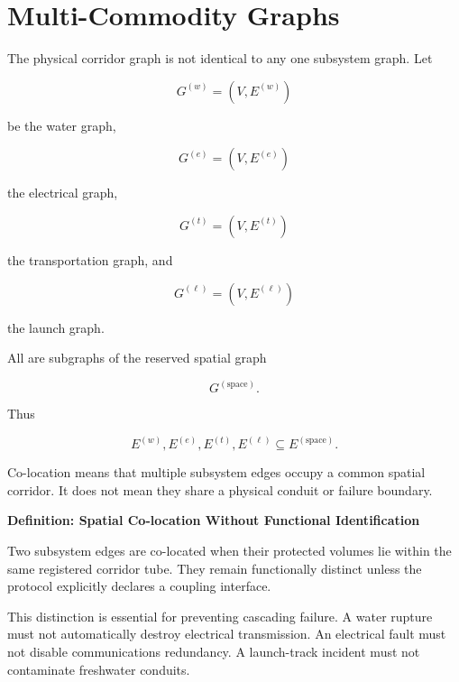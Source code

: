 \documentclass[11pt,fleqn]{book}
\numberwithin{equation}{chapter}
\newenvironment{definition}[1]
  {\begin{definitionEnv}
   \noindent\textbf{Definition: #1}\par\smallskip}
  {\end{definitionEnv}}
\theoremstyle{plain}
\theoremstyle{definition}
\theoremstyle{remark}
\begin{document}
\section{Multi-Commodity Graphs}

The physical corridor graph is not identical to any one subsystem graph. Let

\begin{equation}
    G^{(w)}
    =
    (V,E^{(w)})
\end{equation}

be the water graph,

\begin{equation}
    G^{(e)}
    =
    (V,E^{(e)})
\end{equation}

the electrical graph,

\begin{equation}
    G^{(t)}
    =
    (V,E^{(t)})
\end{equation}

the transportation graph, and

\begin{equation}
    G^{(\ell)}
    =
    (V,E^{(\ell)})
\end{equation}

the launch graph.

All are subgraphs of the reserved spatial graph

\begin{equation}
    G^{(\mathrm{space})}.
\end{equation}

Thus

\begin{equation}
    E^{(w)},
    E^{(e)},
    E^{(t)},
    E^{(\ell)}
    \subseteq
    E^{(\mathrm{space})}.
\end{equation}

Co-location means that multiple subsystem edges occupy a common spatial corridor. It does not mean they share a physical conduit or failure boundary.

\begin{definition}{Spatial Co-location Without Functional Identification}
Two subsystem edges are co-located when their protected volumes lie within the same registered corridor tube. They remain functionally distinct unless the protocol explicitly declares a coupling interface.
\end{definition}

This distinction is essential for preventing cascading failure. A water rupture must not automatically destroy electrical transmission. An electrical fault must not disable communications redundancy. A launch-track incident must not contaminate freshwater conduits.
\end{document}
